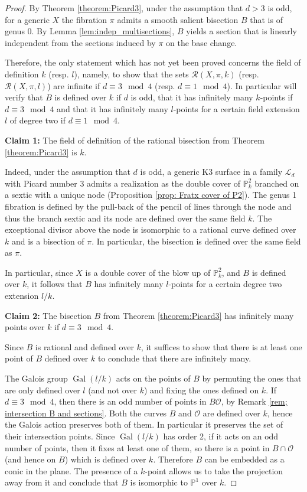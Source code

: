 \documentclass[10pt,a4paper]{amsart}
\DeclareMathOperator{\Gal}{Gal}
\begin{document}
\begin{proof}
By Theorem \ref{theorem:Picard3}, under the assumption that $d>3$ is odd,  for a generic $X$  the fibration $\pi$ admits a smooth salient bisection $B$ that is of genus 0. By Lemma \ref{lem:indep_multisections}, $B$ yields a section that is linearly independent from the sections induced by $\pi$ on the base change.

Therefore, the only statement which has not yet been proved concerns the field of definition $k$ (resp. $l$), namely, to show that the sets $\mathcal{R}(X,\pi, k)$ (resp. $\mathcal{R}(X,\pi, l)$) are infinite if $d\equiv 3\mod 4$ (resp. $d\equiv 1\mod 4$). In particular will  verify that $B$ is defined over $k$ if $d$ is odd, that it has infinitely many $k$-points if $d\equiv 3\mod 4$ and that it has infinitely many $l$-points for a certain field extension $l$ of degree two if $d\equiv 1\mod 4$. 

\textbf{Claim 1:} The field of definition of the rational bisection from Theorem \ref{theorem:Picard3} is $k$. 

Indeed, under the assumption that $d$ is odd, a generic K3 surface in a family $\mathcal{L}_d$ with Picard number 3 admits a realization as the double cover of $\mathbb{P}^2_{k}$ branched on a sextic with a unique node (Proposition \ref{prop: Fratx cover of P2}). The genus 1 fibration is defined by the pull-back of the pencil of lines through the node and thus the branch sextic and its node are defined over the same field $k$. The exceptional divisor above the node is isomorphic to a rational curve defined over $k$ and is a bisection of $\pi$. In particular, the bisection is defined over the same field as $\pi$. 

In particular, since $X$ is a double cover of the blow up of $\mathbb{P}^2_{k}$, and $B$ is defined over $k$, it follows that $B$ has infinitely many $l$-points for a certain degree two extension $l/k$.

\textbf{Claim 2:} The bisection $B$ from Theorem \ref{theorem:Picard3} has infinitely many points over $k$ if $d\equiv 3\mod 4$.

Since $B$ is rational and defined over $k$, it suffices to show that there is at least one point of $B$ defined over $k$ to conclude that there are infinitely many.

The Galois group $\Gal(l/k)$ acts on the points of $B$ by permuting the ones that are only defined over $l$ (and not over $k$) and fixing the ones defined on $k$. If $d\equiv 3 \mod 4$, then there is an odd number of points in $B\mathcal{O}$, by Remark \ref{rem; intersection B and sections}. Both the curves $B$ and $\mathcal{O}$ are defined over $k$, hence the Galois action preserves both of them. In particular it preserves the set of their intersection points. Since $\Gal(l/k)$ has order 2, if it acts on an odd number of points, then it fixes at least one of them, so there is a point in $B\cap \mathcal{O}$ (and hence on $B$) which is defined over $k$. Therefore $B$ can be embedded as a conic in the plane. The presence of a $k$-point allows us to take the projection away from it and conclude that $B$ is isomorphic to $\mathbb{P}^1$ over $k$.
\end{proof}
\end{document}
